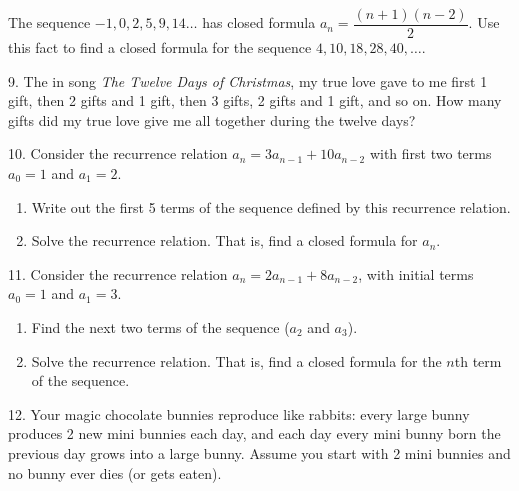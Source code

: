 \documentclass[10pt,]{book}
\theoremstyle{plain}
\theoremstyle{definition}
\numberwithin{equation}{chapter}
\begin{document}
\begin{exerciselist}
            The sequence \(-1, 0, 2, 5, 9, 14\ldots\) has closed formula \(a_n = \dfrac{(n+1)(n-2)}{2}\). Use this fact to find a closed formula for the sequence \(4, 10, 18, 28, 40, \ldots\).
\par\smallskip
\item[9.]\hypertarget{exercise-217}{}
            The in song \emph{The Twelve Days of Christmas}, my true love gave to me first 1 gift, then 2 gifts and 1 gift, then 3 gifts, 2 gifts and 1 gift, and so on.  How many gifts did my true love give me all together during the twelve days?
\par\smallskip
\item[10.]\hypertarget{exercise-218}{}
            Consider the recurrence relation \(a_n = 3a_{n-1} + 10 a_{n-2}\) with first two terms \(a_0 = 1\) and \(a_1 = 2\).
\leavevmode%
\begin{enumerate}[label=(\alph*)]
\item\hypertarget{li-610}{}
                Write out the first 5 terms of the sequence defined by this recurrence relation.
\item\hypertarget{li-611}{}
                Solve the recurrence relation. That is, find a closed formula for \(a_n\).
\end{enumerate}
\par\smallskip
\item[11.]\hypertarget{exercise-219}{}
            Consider the recurrence relation \(a_n = 2a_{n-1} + 8a_{n-2}\), with initial terms \(a_0 = 1\) and \(a_1= 3\).
\leavevmode%
\begin{enumerate}[label=(\alph*)]
\item\hypertarget{li-614}{}
                Find the next two terms of the sequence (\(a_2\) and \(a_3\)).
\item\hypertarget{li-615}{}
                Solve the recurrence relation. That is, find a closed formula for the \(n\)th term of the sequence.
\end{enumerate}
\par\smallskip
\item[12.]\hypertarget{exercise-220}{}
            Your magic chocolate bunnies reproduce like rabbits: every large bunny produces 2 new mini bunnies each day, and each day every mini bunny born the previous day grows into a large bunny. Assume you start with 2 mini bunnies and no bunny ever dies (or gets eaten).
\leavevmode%

\end{exerciselist}
\end{document}
